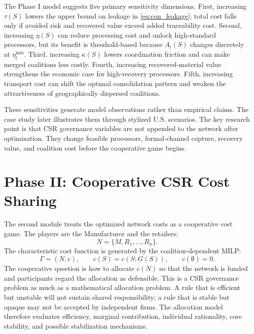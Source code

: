 The Phase I model suggests five primary sensitivity dimensions. First, increasing $\tau(S)$ lowers the upper bound on leakage in \eqref{eq:con_leakage}; total cost falls only if avoided risk and recovered value exceed added traceability cost. Second, increasing $\eta(S)$ can reduce processing cost and unlock high-standard processors, but its benefit is threshold-based because $A_l(S)$ changes discretely at $\eta_l^{\min}$. Third, increasing $\kappa(S)$ lowers coordination friction and can make merged coalitions less costly. Fourth, increasing recovered-material value strengthens the economic case for high-recovery processors. Fifth, increasing transport cost can shift the optimal consolidation pattern and weaken the attractiveness of geographically dispersed coalitions.

These sensitivities generate model observations rather than empirical claims. The case study later illustrates them through stylized U.S. scenarios. The key research point is that CSR governance variables are not appended to the network after optimization. They change feasible processors, formal-channel capture, recovery value, and coalition cost before the cooperative game begins.

\section{Phase II: Cooperative CSR Cost Sharing}
\label{sec:game_theory}

The second module treats the optimized network costs as a cooperative cost game. The players are the Manufacturer and the retailers:
\begin{equation*}
N=\{M,R_1,\ldots,R_n\}.
\end{equation*}
The characteristic cost function is generated by the coalition-dependent MILP:
\begin{equation}
\label{eq:ch4_cost_game}
\Gamma=(N,c),
\qquad
c(S)=c(S;G(S)),
\qquad
c(\emptyset)=0.
\end{equation}
The cooperative question is how to allocate $c(N)$ so that the network is funded and participants regard the allocation as defensible. This is a CSR governance problem as much as a mathematical allocation problem. A rule that is efficient but unstable will not sustain shared responsibility; a rule that is stable but opaque may not be accepted by independent firms. The allocation model therefore evaluates efficiency, marginal contribution, individual rationality, core stability, and possible stabilization mechanisms.

